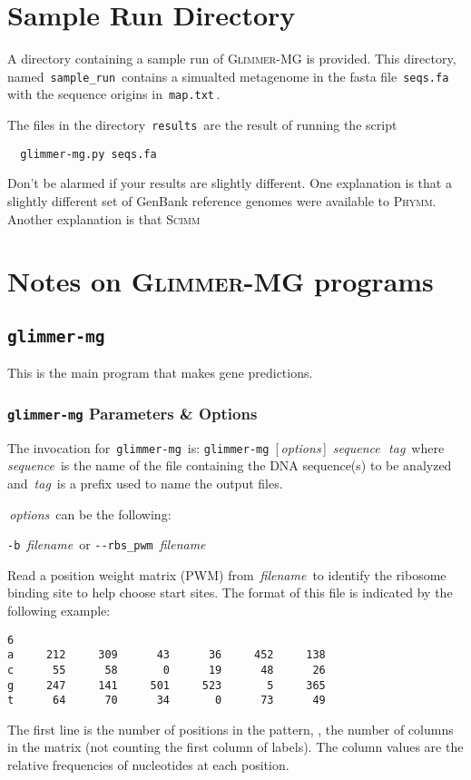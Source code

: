 \documentclass[fleqn,titlepage,11pt]{article}
\def\Desc#1{\,\mbox{\emph{#1}}\,}
\def\Gmg{\textsc{Glimmer-MG}}
\def\Phymm{\textsc{Phymm}}
\def\Scimm{\textsc{Scimm}}
\def\Pg#1{\texttt{#1}}
\begin{document}
\section{Sample Run Directory}

A directory containing a sample run of \Gmg{} is provided.  This
directory, named \,\Pg{sample\_run}\, contains a simualted metagenome
in the fasta file \,\Pg{seqs.fa}\, with the sequence origins in
\,\Pg{map.txt}\,.

The files in the directory \,\Pg{results}\, are the result of
running the script
\BSV
\begin{verbatim}
  glimmer-mg.py seqs.fa
\end{verbatim}
\ESV

Don't be alarmed if your results are slightly different. One
explanation is that a slightly different set of GenBank reference
genomes were available to \Phymm. Another explanation is that \Scimm

\section{Notes on \Gmg{} programs}
\subsection{\Pg{glimmer-mg}}

This is the main program that makes gene predictions.

\subsubsection{\Pg{glimmer-mg} Parameters \& Options}
The invocation for \,\Pg{glimmer-mg}\, is:
\bq
  \Pg{glimmer-mg}\, [\Desc{options}] \Desc{sequence} \Desc{tag}
\eq
where \Desc{sequence} is the name of the file containing the DNA
sequence(s) to be analyzed and \Desc{tag} is a prefix used to name the
output files.

\Desc{options} can be the following:
\bl{}\RaggedRight

\exdent
  \verb`-b` \Desc{filename} \enskip or \enskip \verb`--rbs_pwm` \Desc{filename}

  Read a position weight matrix (PWM) from \Desc{filename} to identify
  the ribosome binding site to help choose start sites.  The format of
  this file is indicated by the following example:
\BSV
\begin{verbatim}
6
a     212     309      43      36     452     138
c      55      58       0      19      48      26
g     247     141     501     523       5     365
t      64      70      34       0      73      49
\end{verbatim}
\ESV
  The first line is the number of positions in the pattern, \ie,
  the number of columns in the matrix (not counting
  the first column of labels).  The column values are the relative
  frequencies of nucleotides at each position.
\end{document}
